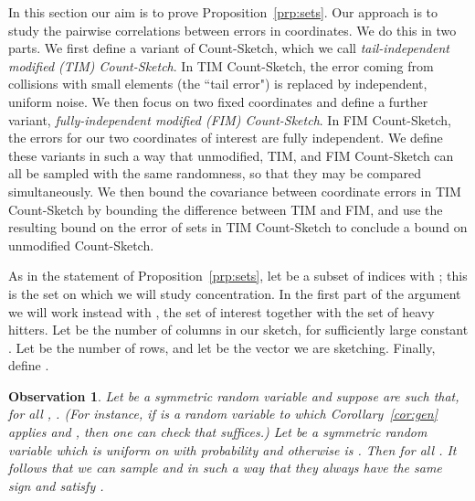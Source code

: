 \documentclass[letterpaper,11pt]{article}
\newtheorem{observation}[theorem]{Observation}
\begin{document}
In this section our aim is to prove Proposition~\ref{prp:sets}.
Our approach is to study the pairwise correlations between
errors in coordinates.  We do this in two parts.
We first define a variant of Count-Sketch,
which we call \emph{tail-independent modified (TIM) Count-Sketch}.
In TIM Count-Sketch, the error coming from collisions with small elements
(the ``tail error") is replaced by independent, uniform noise.   We then focus on two
fixed coordinates and define a further variant,
\emph{fully-independent modified (FIM) Count-Sketch}.  In FIM Count-Sketch,
the errors for our two coordinates of interest are fully independent.
We define these variants in such a way that
unmodified, TIM, and FIM Count-Sketch can all be sampled with the
same randomness, so that they may be compared simultaneously.
We then bound the covariance between coordinate errors in
TIM Count-Sketch by bounding the difference between TIM and
FIM, and use the resulting bound on the error of sets in TIM Count-Sketch
to conclude a bound on unmodified Count-Sketch.

As in the statement of Proposition~\ref{prp:sets}, let 
be a subset of indices with ; this is the set on which we
will study concentration.  In the first part of the argument we will work
instead with , the set of interest together with the set of
heavy hitters.  Let  be the number of columns
in our sketch, for sufficiently large constant .
Let  be the number of rows, and let  be
the vector we are sketching.  Finally, define
.

\begin{observation} \label{obs:resamplebigger}
Let  be a symmetric random variable and suppose  are such that, for all ,
.
(For instance, if  is a random variable to which Corollary~\ref{cor:gen} applies
and , then one can check that  suffices.)
Let  be a symmetric random variable which is uniform on
 with probability  and otherwise is .
Then 
for all .  It follows that we can sample
 and  in such a way that they always have the
same sign and satisfy .
\end{observation}
\end{document}

